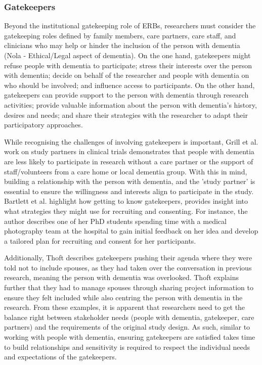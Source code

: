 \subsubsection{Gatekeepers}
Beyond the institutional gatekeeping role of ERBs, researchers must consider the gatekeeping roles defined by family members, care partners, care staff, and clinicians who may help or hinder the inclusion of the person with dementia (Nola - Ethical/Legal aspect of dementia). On the one hand, gatekeepers might refuse people with dementia to participate; stress their interests over the person with dementia; decide on behalf of the researcher and people with dementia on who should be involved; and influence access to participants. On the other hand, gatekeepers can provide support to the person with dementia through research activities; provide valuable information about the person with dementia's history, desires and needs; and share their strategies with the researcher to adapt their participatory approaches.

While recognising the challenges of involving gatekeepers is important, Grill et al. work on study partners in clinical trials demonstrates that people with dementia are less likely to participate in research without a care partner or the support of staff/volunteers from a care home or local dementia group. With this in mind, building a relationship with the person with dementia, and the 'study partner' is essential to ensure the willingness and interests align to participate in the study. Bartlett et al. highlight how getting to know gatekeepers, provides insight into what strategies they might use for recruiting and consenting. For instance, the author describes one of her PhD students spending time with a medical photography team at the hospital to gain initial feedback on her idea and develop a tailored plan for recruiting and consent for her participants. 

Additionally, Thoft describes gatekeepers pushing their agenda where they were told not to include spouses, as they had taken over the conversation in previous research, meaning the person with dementia was overlooked. Thoft explains further that they had to manage spouses through sharing project information to ensure they felt included while also centring the person with dementia in the research. From these examples, it is apparent that researchers need to get the balance right between stakeholder needs (people with dementia, gatekeeper, care partners) and the requirements of the original study design. As such, similar to working with people with dementia, ensuring gatekeepers are satisfied takes time to build relationships and sensitivity is required to respect the individual needs and expectations of the gatekeepers.

